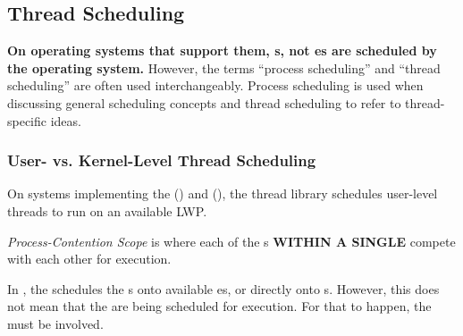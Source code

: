 \subsection{Thread Scheduling}\label{subsec:Thread_Scheduling}
\begin{blackbox}
  \textbf{On operating systems that support them, s, not es are scheduled by the operating system.}
  However, the terms ``process scheduling'' and ``thread scheduling'' are often used interchangeably.
  Process scheduling is used when discussing general scheduling concepts and thread scheduling to refer to thread-specific ideas.
\end{blackbox}

\subsubsection{User- vs. Kernel-Level Thread Scheduling}\label{subsubsec:User_vs_Kernel_Thread_Scheduling}
On systems implementing the  () and  (), the thread library schedules user-level threads to run on an available LWP.\@

\begin{definition}\label{def:Process_Contention_Scope}
  \emph{Process-Contention Scope} is where each of the s \textbf{WITHIN A SINGLE } compete with each other for execution.
\end{definition}

In , the  schedules the s onto available es, or directly onto s.
However, this does not mean that the  are being scheduled for execution.
For that to happen, the  must be involved.


